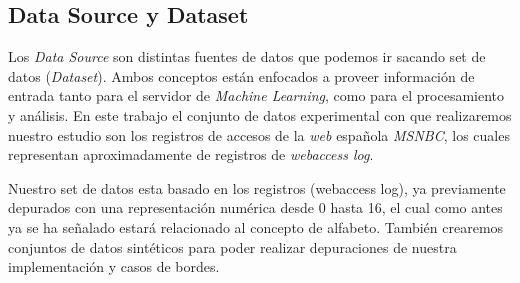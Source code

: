 \subsection{Data Source y Dataset }

	Los \emph{Data Source} son distintas fuentes de datos que podemos ir sacando set de datos (\emph{Dataset}). Ambos conceptos están enfocados a proveer información de entrada tanto para el servidor de \emph{Machine Learning}, como para el procesamiento y análisis.
	En este trabajo el conjunto de datos experimental con que realizaremos nuestro estudio son los registros de accesos de la \emph{web} española \emph{MSNBC}\cite{Claude2014}, los cuales representan aproximadamente de registros de \emph{webaccess log}.

	Nuestro set de  datos esta basado en los registros (webaccess log), ya previamente depurados con una representación numérica desde 0 hasta 16, el cual como antes ya se ha señalado estará relacionado al concepto de alfabeto. También crearemos conjuntos de datos sintéticos para poder realizar depuraciones de nuestra implementación y casos de bordes.
	
	 



 














